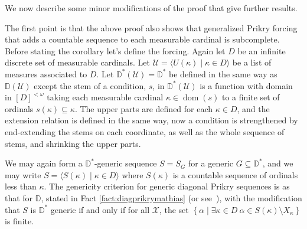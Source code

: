 \documentclass{amsart}
\theoremstyle{definition}
\theoremstyle{remark}
\newcommand{\D}{\mathbb{D}}
\newcommand{\U}{\mathcal{U}}
\DeclareMathOperator{\dom}{dom}
\newcommand{\st}{\; | \;}
\newcommand{\set}[2]{\left\{#1\st #2 \right\}}
\newcommand{\seq}[2]{\langle #1 \st #2 \rangle}
\begin{document}
We now describe some minor modifications of the proof that give further results.

The first point is that the above proof also shows that generalized Prikry forcing that adds a countable sequence to each measurable cardinal is subcomplete. Before stating the corollary let's define the forcing. Again let $D$ be an infinite discrete set of measurable cardinals. Let $\U = \seq{ U(\kappa) }{ \kappa \in D }$ be a list of measures associated to $D$. 
Let $\D^*(\U) = \D^*$ be defined in the same way as $\D(\U)$ except the stem of a condition, $s$, in $\D^*(\U)$ is a function with domain in $[D]^{<\omega}$ taking each measurable cardinal $\kappa \in \dom(s)$ to a finite set of ordinals $s(\kappa) \subseteq \kappa$. 
The upper parts are defined for each $\kappa\in D$, and the extension relation is defined in the same way, now a condition is strengthened by end-extending the stems on each coordinate, as well as the whole sequence of stems, and shrinking the upper parts.

We may again form a $\D^*$-generic sequence $S = S_G$ for a generic $G \subseteq \D^*$, and we may write $S = \seq{ S(\kappa) }{ \kappa \in D }$ where $S(\kappa)$ is a countable sequence of ordinals less than $\kappa$. The genericity criterion for generic diagonal Prikry sequences is as that for $\D$, stated in Fact \ref{fact:diagprikrymathias} (or see~\cite[Thm.~1]{Fuchs:2005kx}), with the modification that $S$ is $\D^*$ generic if and only if for all $\mathcal X$, the set $\set{ \alpha }{ \exists \kappa \in D \ \alpha \in S(\kappa) \setminus X_\kappa }$ is finite.
\end{document}
